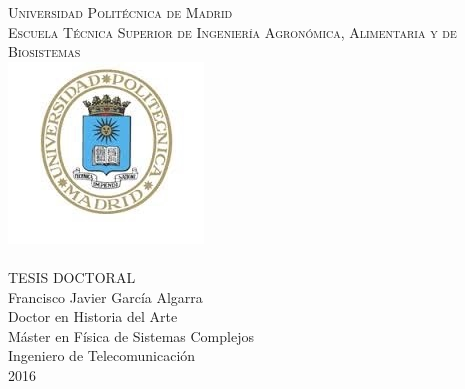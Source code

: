 \documentclass[
11pt, %
spanish, %
onehalfspacing, %
]{MastersDoctoralThesis_custom} %
\author{\textsc{Francisco Javier García Algarra}} %
\newcommand\blankpage{%
    \null
    \thispagestyle{empty}%
    \addtocounter{page}{-1}%
    \newpage}
\begin{document}
\frontmatter %

\pagestyle{plain} %

\begin{titlepage}
\begin{center}
\textsc{\Large Universidad  Politécnica de Madrid}\\
\textsc{\large Escuela Técnica Superior de Ingeniería Agronómica, Alimentaria y de Biosistemas}\\[1cm]
\includegraphics[scale=1]{Figures/logoupm.jpg}\\[2cm]

{\huge \textsc \ttitle}\\[3cm]
\Large TESIS DOCTORAL\\[3cm]
{\Large Francisco Javier García Algarra}\\[0.15cm]
\small Doctor en Historia del Arte\\
\small Máster en Física de Sistemas Complejos\\
\small Ingeniero de Telecomunicación\\[3.0cm] 
{\large 2016} %

\clearpage
\end{center}
\end{titlepage}
\afterpage{\blankpage}
\end{document}
